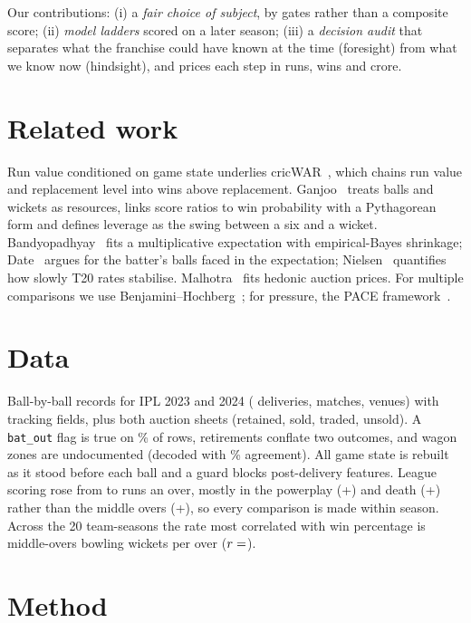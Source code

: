 \documentclass[10pt,twocolumn,letterpaper]{article}
\begin{document}
Our contributions: (i) a \emph{fair choice of subject}, by gates rather than a composite score; (ii) \emph{model ladders} scored on a later season; (iii) a \emph{decision audit} that separates what the franchise could have known at the time (foresight) from what we know now (hindsight), and prices each step in runs, wins and crore.

\section{Related work}
Run value conditioned on game state underlies cricWAR~\cite{rafique2022}, which chains run value and replacement level into wins above replacement. Ganjoo~\cite{ganjoo2026} treats balls and wickets as resources, links score ratios to win probability with a Pythagorean form and defines leverage as the swing between a six and a wicket. Bandyopadhyay~\cite{bandyopadhyay} fits a multiplicative expectation with empirical-Bayes shrinkage; Date~\cite{date} argues for the batter's balls faced in the expectation; Nielsen~\cite{nielsen} quantifies how slowly T20 rates stabilise. Malhotra~\cite{malhotra2022} fits hedonic auction prices. For multiple comparisons we use Benjamini--Hochberg~\cite{bh1995}; for pressure, the PACE framework~\cite{gupta2026}.

\section{Data}
Ball-by-ball records for IPL 2023 and 2024 ( deliveries,  matches,  venues) with tracking fields, plus both auction sheets (retained, sold, traded, unsold). A \texttt{bat\_out} flag is true on \% of rows, retirements conflate two outcomes, and wagon zones are undocumented (decoded with \% agreement). All game state is rebuilt as it stood before each ball and a guard blocks post-delivery features. League scoring rose from  to  runs an over, mostly in the powerplay (+) and death (+) rather than the middle overs (+), so every comparison is made within season. Across the 20 team-seasons the rate most correlated with win percentage is middle-overs bowling wickets per over ($r=\kv{wincorr}$).

\section{Method}
\end{document}
